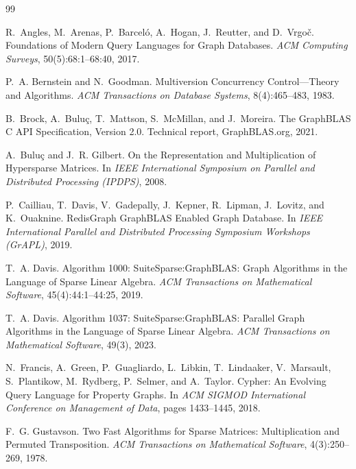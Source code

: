 \documentclass[11pt,a4paper]{article}
\theoremstyle{plain}
\theoremstyle{definition}
\theoremstyle{remark}
\begin{document}
\begin{thebibliography}{99}
\small

R.~Angles, M.~Arenas, P.~Barceló, A.~Hogan, J.~Reutter, and D.~Vrgoč.
\newblock Foundations of Modern Query Languages for Graph Databases.
\newblock \emph{ACM Computing Surveys}, 50(5):68:1--68:40, 2017.

P.~A. Bernstein and N.~Goodman.
\newblock Multiversion Concurrency Control---Theory and Algorithms.
\newblock \emph{ACM Transactions on Database Systems}, 8(4):465--483, 1983.

B.~Brock, A.~Buluç, T.~Mattson, S.~McMillan, and J.~Moreira.
\newblock The GraphBLAS C API Specification, Version 2.0.
\newblock Technical report, GraphBLAS.org, 2021.

A.~Buluç and J.~R. Gilbert.
\newblock On the Representation and Multiplication of Hypersparse Matrices.
\newblock In \emph{IEEE International Symposium on Parallel and Distributed
Processing (IPDPS)}, 2008.

P.~Cailliau, T.~Davis, V.~Gadepally, J.~Kepner, R.~Lipman, J.~Lovitz, and
K.~Ouaknine.
\newblock RedisGraph GraphBLAS Enabled Graph Database.
\newblock In \emph{IEEE International Parallel and Distributed Processing
Symposium Workshops (GrAPL)}, 2019.

T.~A. Davis.
\newblock Algorithm 1000: SuiteSparse:GraphBLAS: Graph Algorithms in the
Language of Sparse Linear Algebra.
\newblock \emph{ACM Transactions on Mathematical Software}, 45(4):44:1--44:25,
2019.

T.~A. Davis.
\newblock Algorithm 1037: SuiteSparse:GraphBLAS: Parallel Graph Algorithms in
the Language of Sparse Linear Algebra.
\newblock \emph{ACM Transactions on Mathematical Software}, 49(3), 2023.

N.~Francis, A.~Green, P.~Guagliardo, L.~Libkin, T.~Lindaaker, V.~Marsault,
S.~Plantikow, M.~Rydberg, P.~Selmer, and A.~Taylor.
\newblock Cypher: An Evolving Query Language for Property Graphs.
\newblock In \emph{ACM SIGMOD International Conference on Management of Data},
pages 1433--1445, 2018.

F.~G. Gustavson.
\newblock Two Fast Algorithms for Sparse Matrices: Multiplication and Permuted
Transposition.
\newblock \emph{ACM Transactions on Mathematical Software}, 4(3):250--269,
1978.


\end{thebibliography}
\end{document}
